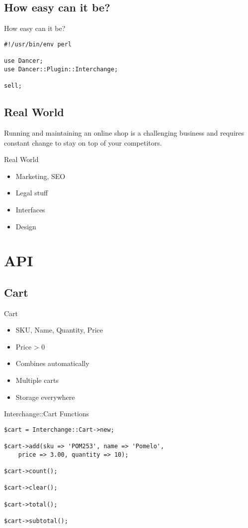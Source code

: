 \subsection{How easy can it be?}
\begin{frame}[fragile]{How easy can it be?}
\begin{lstlisting}
#!/usr/bin/env perl

use Dancer;
use Dancer::Plugin::Interchange;

sell;
\end{lstlisting}
\end{frame}

\subsection{Real World}
Running and maintaining an online shop is a challenging business
and requires constant change to stay on top of your competitors.

\begin{frame}{Real World}
\begin{itemize}
\item Marketing, SEO
\item Legal stuff
\item Interfaces
\item Design
\end{itemize}
\end{frame}

\section{API}
\subsection{Cart}
\begin{frame}{Cart}
\begin{itemize}
\item SKU, Name, Quantity, Price
\item Price > 0
\item Combines automatically
\item Multiple carts
\item Storage everywhere
\end{itemize}
\end{frame}

\begin{frame}[fragile]{Interchange::Cart Functions}
\begin{lstlisting}
$cart = Interchange::Cart->new;

$cart->add(sku => 'POM253', name => 'Pomelo',
    price => 3.00, quantity => 10);

$cart->count();

$cart->clear();

$cart->total();

$cart->subtotal();
\end{lstlisting}
\end{frame}

